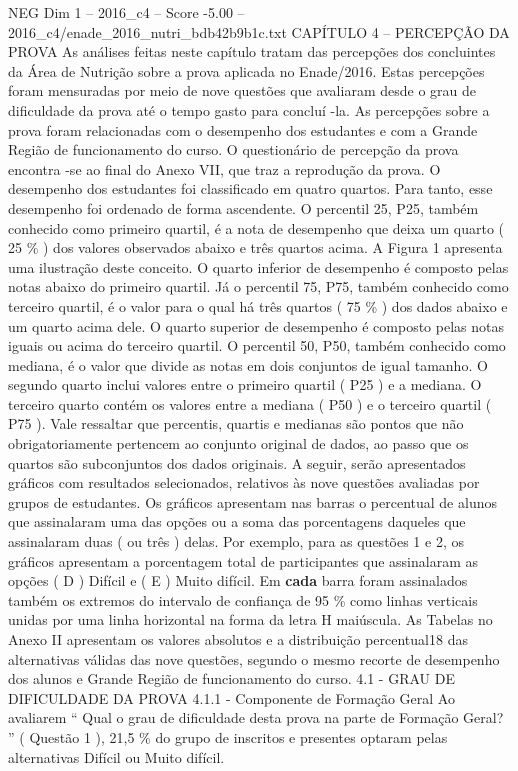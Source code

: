 \begin{textsample}{NEG Dim 1 – 2016\_c4 – Score -5.00 – 2016\_c4/enade\_2016\_nutri\_bdb42b9b1c.txt}  \label{ex:f1_neg_151}
CAPÍTULO 4 – PERCEPÇÃO DA PROVA As análises feitas neste capítulo tratam das percepções dos concluintes da Área de Nutrição sobre a prova aplicada no Enade/2016.
Estas percepções foram mensuradas por meio de nove questões que avaliaram desde o grau de dificuldade da prova até o tempo gasto para concluí -la.
As percepções sobre a prova foram relacionadas com o desempenho dos estudantes e com a Grande Região de funcionamento do curso.
O questionário de percepção da prova encontra -se ao final do Anexo VII, que traz a reprodução da prova.
O desempenho dos estudantes foi classificado em quatro quartos.
Para tanto, esse desempenho foi ordenado de forma ascendente.
O percentil 25, P25, também conhecido como primeiro quartil, é a nota de desempenho que deixa um quarto ( 25 \% ) dos valores observados abaixo e três quartos acima.
A Figura 1 apresenta uma ilustração deste conceito.
O quarto inferior de desempenho é composto pelas notas abaixo do primeiro quartil.
Já o percentil 75, P75, também conhecido como terceiro quartil, é o valor para o qual há três quartos ( 75 \% ) dos dados abaixo e um quarto acima dele.
O quarto superior de desempenho é composto pelas notas iguais ou acima do terceiro quartil.
O percentil 50, P50, também conhecido como mediana, é o valor que divide as notas em dois conjuntos de igual tamanho.
O segundo quarto inclui valores entre o primeiro quartil ( P25 ) e a mediana.
O terceiro quarto contém os valores entre a mediana ( P50 ) e o terceiro quartil ( P75 ).
Vale ressaltar que percentis, quartis e medianas são pontos que não obrigatoriamente pertencem ao conjunto original de dados, ao passo que os quartos são subconjuntos dos dados originais.
A seguir, serão apresentados gráficos com resultados selecionados, relativos às nove questões avaliadas por grupos de estudantes.
Os gráficos apresentam nas barras o percentual de alunos que assinalaram uma das opções ou a soma das porcentagens daqueles que assinalaram duas ( ou três ) delas.
Por exemplo, para as questões 1 e 2, os gráficos apresentam a porcentagem total de participantes que assinalaram as opções ( D ) Difícil e ( E ) Muito difícil.
Em \textbf{cada} barra foram assinalados também os extremos do intervalo de confiança de 95 \% como linhas verticais unidas por uma linha horizontal na forma da letra H maiúscula.
As Tabelas no Anexo II apresentam os valores absolutos e a distribuição percentual18 das alternativas válidas das nove questões, segundo o mesmo recorte de desempenho dos alunos e Grande Região de funcionamento do curso. 4.1 - GRAU DE DIFICULDADE DA PROVA 4.1.1 - Componente de Formação Geral Ao avaliarem “ Qual o grau de dificuldade desta prova na parte de Formação Geral? ” ( Questão 1 ), 21,5 \% do grupo de inscritos e presentes optaram pelas alternativas Difícil ou Muito difícil.

\end{textsample}
